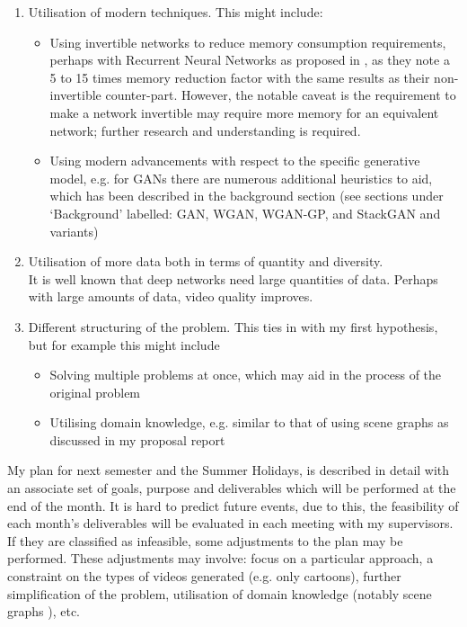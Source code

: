 \documentclass{article}
\begin{document}
{{\begin{enumerate}
    \item Utilisation of modern techniques. This might include: 
        \begin{itemize}
            \item Using invertible networks to reduce memory consumption requirements, perhaps with Recurrent Neural Networks as proposed in \cite{mackay_reversible_2018}, as they 
                  note a 5 to 15 times memory reduction factor with the same results as their non-invertible counter-part. However, the notable caveat is the requirement
                  to make a network invertible may require more memory for an equivalent network; further research and understanding is required.
            \item Using modern advancements with respect to the specific generative model, e.g. for GANs there are numerous additional heuristics to aid, which 
                has been described in the background section (see sections under `Background' labelled: GAN, WGAN, WGAN-GP, and StackGAN and variants)
        \end{itemize}
    \item Utilisation of more data both in terms of quantity and diversity.\\
         It is well known that deep networks need large quantities of data. Perhaps with large amounts of data, video quality improves.
    \item Different structuring of the problem. This ties in with my first hypothesis, but for example this might include
        \begin{itemize}
            \item Solving multiple problems at once, which may aid in the process of the original problem
            \item Utilising domain knowledge, e.g. similar to that of using scene graphs \cite{johnson_image_2018} as discussed in my proposal report
        \end{itemize}
\end{enumerate}

My plan for next semester and the Summer Holidays, is described in detail with
an associate set of goals, purpose and deliverables which will be performed at
the end of the month. It is hard to predict future events, due to this, the
feasibility of each month's deliverables will be evaluated in each meeting with
my supervisors. If they are classified as infeasible, some adjustments to the
plan may be performed. These adjustments may involve: focus on a particular
approach, a constraint on the types of videos generated (e.g. only cartoons),
further simplification of the problem, utilisation of domain knowledge (notably
scene graphs \cite{johnson_image_2018}), etc.

}}
\end{document}
